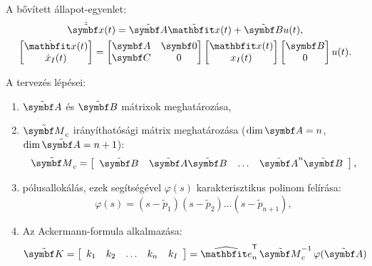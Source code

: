 A bővített állapot-egyenlet:
\begin{gather}
  \dot{\tmat x}(t) = \tmat A \tvec x(t) + \tmat B u(t)
  ,
  \\
  \begin{bmatrix}
    \dot{\rvec x}(t) \\ \dot x_I(t)
  \end{bmatrix} = \begin{bmatrix}
    \rmat A & \rmat 0 \\ \rmat C & 0
  \end{bmatrix} \begin{bmatrix}
    \rvec x(t) \\ x_I(t)
  \end{bmatrix} \begin{bmatrix}
    \rmat B \\ 0
  \end{bmatrix} u(t)
  .
\end{gather}

A tervezés lépései:
\bgroup
\def\arraystretch{1.2}
\begin{enumerate}[label={\color{darkRed}\theenumi})]
  \item $\tmat A$ és $\tmat B$ mátrixok meghatározása,
  \item $\tmat M_c$ irányíthatósági mátrix meghatározása ($\dim \rmat A = n$,
        $\dim \tmat A = n+1$):
        \begin{equation}
          \tmat M_c = \left[\begin{array}{ c : c : c : c }
              \tmat B         &
              \tmat A \tmat B &
              \dots           &
              \tmat A^{n} \tmat B
            \end{array}\right],
        \end{equation}
  \item pólusallokálás, ezek segítségével $\varphi(s)$ karakterisztikus polinom
        felírása:
        \begin{equation}
          \varphi(s) = (s - \tilde p_1)(s - \tilde p_2) \dots (s - \tilde p_{n+1}),
        \end{equation}
  \item Az Ackermann-formula alkalmazása:
        \begin{equation}
          \tmat K = \left[\begin{array}{c c c c : c}
              k_1 & k_2 & \dots & k_n & k_I
            \end{array}\right]
          = \uvec e_n^\T
          \,\tmat M_c^{-1}
          \,\varphi({\tmat A})
        \end{equation}
\end{enumerate}
\egroup

\clearpage
